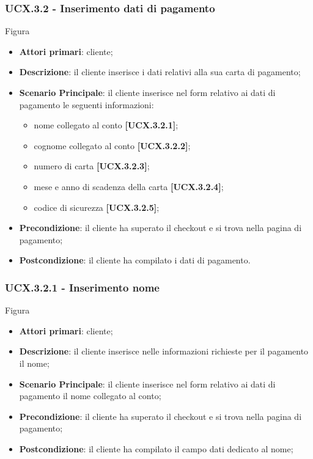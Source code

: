 \subsubsection{UCX.3.2 - Inserimento dati di pagamento}
Figura \\
\begin{itemize}
\item \textbf{Attori primari}: cliente;
\item \textbf{Descrizione}: il cliente inserisce i dati relativi alla sua carta di pagamento;
\item \textbf{Scenario Principale}: il cliente inserisce nel form relativo ai dati di pagamento le seguenti informazioni:
\begin{itemize}
	\item nome collegato al conto \textbf{[UCX.3.2.1]};
	\item cognome collegato al conto \textbf{[UCX.3.2.2]};
	\item numero di carta \textbf{[UCX.3.2.3]};
	\item mese e anno di scadenza della carta \textbf{[UCX.3.2.4]};
	\item codice di sicurezza \textbf{[UCX.3.2.5]};
\end{itemize}
\item \textbf{Precondizione}: il cliente ha superato il checkout e si trova nella pagina di pagamento;
\item \textbf{Postcondizione}: il cliente ha compilato i dati di pagamento.
\end{itemize}

\subsubsection{UCX.3.2.1 - Inserimento nome}
Figura \\
\begin{itemize}
\item \textbf{Attori primari}: cliente;
\item \textbf{Descrizione}: il cliente inserisce nelle informazioni richieste per il pagamento il nome;
\item \textbf{Scenario Principale}: il cliente inserisce nel form relativo ai dati di pagamento il nome collegato al conto;
\item \textbf{Precondizione}: il cliente ha superato il checkout e si trova nella pagina di pagamento;
\item \textbf{Postcondizione}: il cliente ha compilato il campo dati dedicato al nome;
\end{itemize}

